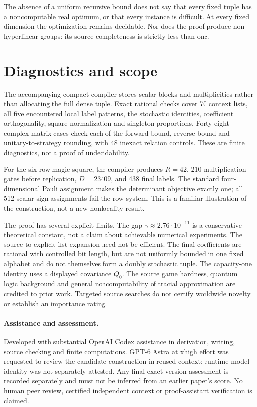\documentclass[11pt,a4paper]{article}
\begin{document}
The absence of a uniform recursive bound does not say that every fixed tuple has a noncomputable real optimum, or that every instance is difficult. At every fixed dimension the optimization remains decidable. Nor does the proof produce non-hyperlinear groups: its source completeness is strictly less than one.

\section{Diagnostics and scope}
The accompanying compact compiler stores scalar blocks and multiplicities rather than allocating the full dense tuple. Exact rational checks cover 70 context lists, all five encountered local label patterns, the stochastic identities, coefficient orthogonality, square normalization and singleton proportions. Forty-eight complex-matrix cases check each of the forward bound, reverse bound and unitary-to-strategy rounding, with 48 inexact relation controls. These are finite diagnostics, not a proof of undecidability.

For the six-row magic square, the compiler produces $R=42$, 210 multiplication gates before replication, $D=23409$, and 438 final labels. The standard four-dimensional Pauli assignment makes the determinant objective exactly one; all 512 scalar sign assignments fail the row system. This is a familiar illustration of the construction, not a new nonlocality result.

The proof has several explicit limits. The gap $\gamma\approx2.76\cdot10^{-11}$ is a conservative theoretical constant, not a claim about achievable numerical experiments. The source-to-explicit-list expansion need not be efficient. The final coefficients are rational with controlled bit length, but are not uniformly bounded in one fixed alphabet and do not themselves form a doubly stochastic tuple. The capacity-one identity uses a displayed covariance $Q_0$. The source game hardness, quantum logic background and general noncomputability of tracial approximation are credited to prior work. Targeted source searches do not certify worldwide novelty or establish an importance rating.

\paragraph{Assistance and assessment.}
Developed with substantial OpenAI Codex assistance in derivation, writing, source checking and finite computations. GPT-6 Astra at xhigh effort was requested to review the candidate construction in reused context; runtime model identity was not separately attested. Any final exact-version assessment is recorded separately and must not be inferred from an earlier paper's score. No human peer review, certified independent context or proof-assistant verification is claimed.
\end{document}

